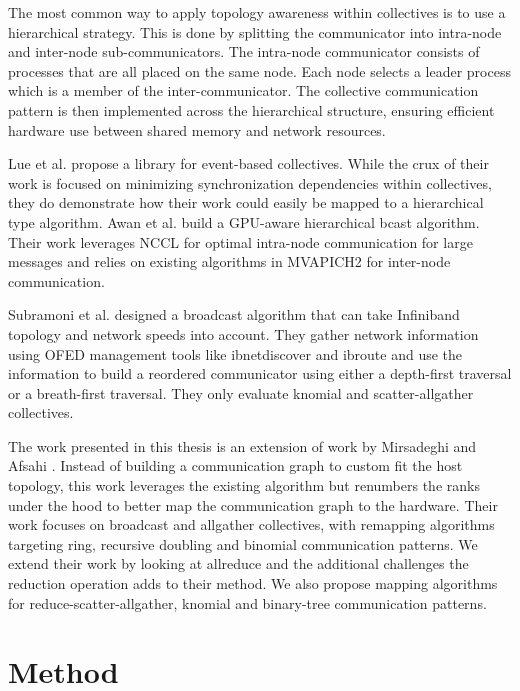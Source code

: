 The most common way to apply topology awareness within collectives is to use a hierarchical strategy.
This is done by splitting the communicator into intra-node and inter-node sub-communicators.
The intra-node communicator consists of processes that are all placed on the same node.
Each node selects a leader process which is a member of the inter-communicator.
The collective communication pattern is then implemented across the hierarchical structure, ensuring efficient hardware use between shared memory and network resources.

Lue et al. \cite{Luo2018ADAPT} propose a library for event-based collectives.
While the crux of their work is focused on minimizing synchronization dependencies within collectives, they do demonstrate how their work could easily be mapped to a hierarchical type algorithm.
Awan et al. \cite{Awan2016NCCLBcast} build a GPU-aware hierarchical bcast algorithm.
Their work leverages NCCL for optimal intra-node communication for large messages and relies on existing algorithms in MVAPICH2 for inter-node communication.

Subramoni et al. \cite{Subramoni2011SpeedAwareBcast} designed a broadcast algorithm that can take Infiniband topology and network speeds into account.
They gather network information using OFED management tools like ibnetdiscover and ibroute and use the information to build a reordered communicator using either a depth-first traversal or a breath-first traversal.
They only evaluate knomial and scatter-allgather collectives.

The work presented in this thesis is an extension of work by Mirsadeghi and Afsahi \cite{Mirsadeghi2016TopoAwareCollRR}.
Instead of building a communication graph to custom fit the host topology, this work leverages the existing algorithm but renumbers the ranks under the hood to better map the communication graph to the hardware.
Their work focuses on broadcast and allgather collectives, with remapping algorithms targeting ring, recursive doubling and binomial communication patterns.
We extend their work by looking at allreduce and the additional challenges the reduction operation adds to their method.
We also propose mapping algorithms for reduce-scatter-allgather, knomial and binary-tree communication patterns.

\section{Method}

\lstset{style = bklstc}
\lstset{label = lst:topo-generic-strategy}
\lstset{caption = General greedy heuristic for topology-aware rank reordering.}


